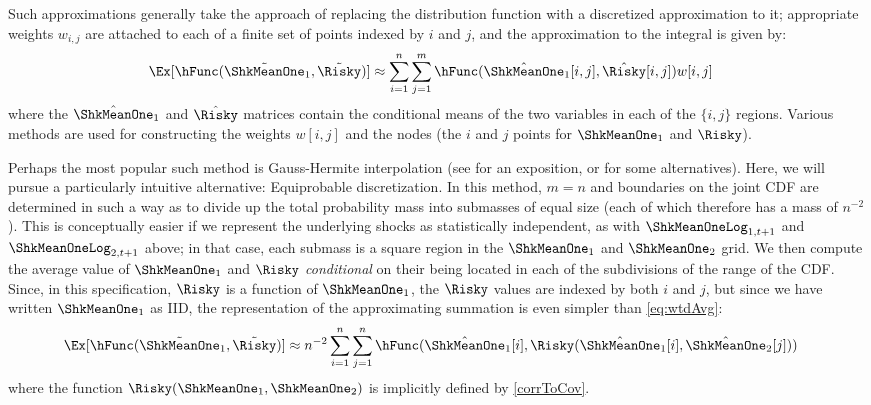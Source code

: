 \documentclass{handout}
\begin{document}
Such approximations generally take the approach of replacing the distribution function
with a discretized approximation to it; appropriate weights $w_{i,j}$ are attached to
each of a finite set of points indexed by $i$ and $j$, and 
the approximation to the integral is given by:
\begin{equation}\begin{gathered}\begin{aligned}
  \Ex[\hFunc(\tilde{\ShkMeanOne}_{1},\tilde{\Risky})] & \approx  \sum_{i=1}^{n}\sum_{j=1}^{m} \hFunc(\hat{\ShkMeanOne}_{1}[i,j],\hat{\Risky}[i,j])w[i,j]  \label{eq:wtdAvg}
\end{aligned}\end{gathered}\end{equation}
where the $\hat{\ShkMeanOne}_{1}$ and $\hat{\Risky}$ matrices contain the conditional means of the two variables in each of the $\{i,j\}$ regions.  Various methods are used for constructing the weights $w[i,j]$ and the nodes (the $i$ and $j$ points for
$\ShkMeanOne_{1}$ and $\Risky$).  

Perhaps the most popular such method is Gauss-Hermite interpolation (see
\cite{judd:book} for an exposition, or \cite{kopecky2010finite} for
some alternatives).  Here, we will pursue a particularly intuitive
alternative: Equiprobable discretization.  In this method, $m=n$ and
boundaries on the joint CDF are determined in such a way as to divide
up the total probability mass into submasses of equal size (each of
which therefore has a mass of $n^{-2}$).  This is conceptually easier
if we represent the underlying shocks as statistically
independent, as with $\ShkMeanOneLog_{1,t+1}$ and $\ShkMeanOneLog_{2,t+1}$ above; in that case, each submass is a square region
in the $\ShkMeanOne_{1}$ and $\ShkMeanOne_{2}$ grid.  We then compute the average
value of $\ShkMeanOne_{1}$ and $\Risky$ {\it conditional} on their being
located in each of the subdivisions of the range of the CDF.  Since,
in this specification, $\Risky$ is a function of $\ShkMeanOne_{1}$, the
$\Risky$ values are indexed by both $i$ and $j$, but since we have
written $\ShkMeanOne_{1}$ as IID, the representation of the approximating
summation is even simpler than \eqref{eq:wtdAvg}:
\begin{equation}\begin{gathered}\begin{aligned}
  \Ex[\hFunc(\tilde{\ShkMeanOne}_{1},\tilde{\Risky})] & \approx  n^{-2} \sum_{i=1}^{n}\sum_{j=1}^{n} \hFunc(\hat{\ShkMeanOne}_{1}[i],\Risky(\hat{\ShkMeanOne}_{1}[i],\hat{\ShkMeanOne}_{2}[j])) \label{eq:wtdAvgMod}
\end{aligned}\end{gathered}\end{equation}
where the function $\Risky(\ShkMeanOne_{1},\ShkMeanOne_{2})$ is implicitly defined by \eqref{corrToCov}.
\end{document}
